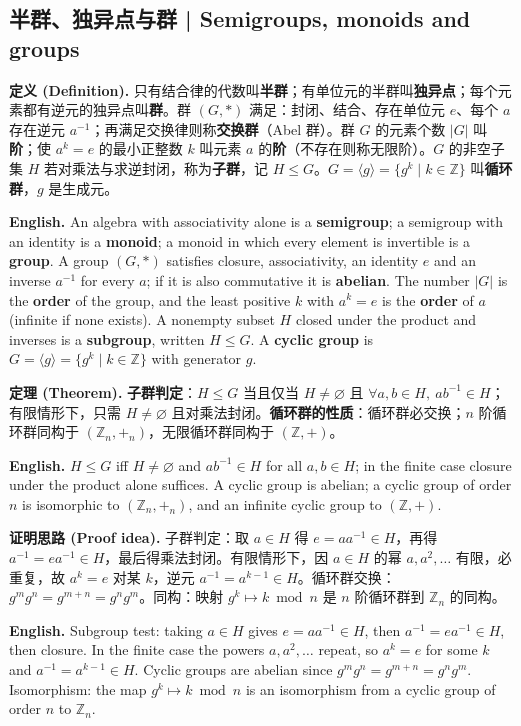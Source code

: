\documentclass[UTF8,11pt,a4paper]{ctexart}
\newcommand{\EN}[1]{\par\noindent \textbf{English.} #1\par}
\newcommand{\DEF}[2]{\par\noindent\textbf{定义 (Definition).} #1\par\EN{#2}}
\newcommand{\THM}[2]{\par\noindent\textbf{定理 (Theorem).} #1\par\EN{#2}}
\newcommand{\PRF}[2]{\par\noindent\textbf{证明思路 (Proof idea).} #1\par\EN{#2}}
\begin{document}
\subsection{半群、独异点与群 | Semigroups, monoids and groups}
\DEF{只有结合律的代数叫\textbf{半群}；有单位元的半群叫\textbf{独异点}；每个元素都有逆元的独异点叫\textbf{群}。群 $(G,*)$ 满足：封闭、结合、存在单位元 $e$、每个 $a$ 存在逆元 $a^{-1}$；再满足交换律则称\textbf{交换群}（Abel 群）。群 $G$ 的元素个数 $|G|$ 叫\textbf{阶}；使 $a^k=e$ 的最小正整数 $k$ 叫元素 $a$ 的\textbf{阶}（不存在则称无限阶）。$G$ 的非空子集 $H$ 若对乘法与求逆封闭，称为\textbf{子群}，记 $H\le G$。$G=\langle g\rangle=\{g^k\mid k\in\mathbb Z\}$ 叫\textbf{循环群}，$g$ 是生成元。}{An algebra with associativity alone is a \textbf{semigroup}; a semigroup with an identity is a \textbf{monoid}; a monoid in which every element is invertible is a \textbf{group}. A group $(G,*)$ satisfies closure, associativity, an identity $e$ and an inverse $a^{-1}$ for every $a$; if it is also commutative it is \textbf{abelian}. The number $|G|$ is the \textbf{order} of the group, and the least positive $k$ with $a^k=e$ is the \textbf{order} of $a$ (infinite if none exists). A nonempty subset $H$ closed under the product and inverses is a \textbf{subgroup}, written $H\le G$. A \textbf{cyclic group} is $G=\langle g\rangle=\{g^k\mid k\in\mathbb Z\}$ with generator $g$.}
\THM{\textbf{子群判定}：$H\le G$ 当且仅当 $H\ne\varnothing$ 且 $\forall a,b\in H,\ ab^{-1}\in H$；有限情形下，只需 $H\ne\varnothing$ 且对乘法封闭。\textbf{循环群的性质}：循环群必交换；$n$ 阶循环群同构于 $(\mathbb Z_n,+_n)$，无限循环群同构于 $(\mathbb Z,+)$。}{$H\le G$ iff $H\ne\varnothing$ and $ab^{-1}\in H$ for all $a,b\in H$; in the finite case closure under the product alone suffices. A cyclic group is abelian; a cyclic group of order $n$ is isomorphic to $(\mathbb Z_n,+_n)$, and an infinite cyclic group to $(\mathbb Z,+)$.}
\PRF{子群判定：取 $a\in H$ 得 $e=aa^{-1}\in H$，再得 $a^{-1}=ea^{-1}\in H$，最后得乘法封闭。有限情形下，因 $a\in H$ 的幂 $a,a^2,\dots$ 有限，必重复，故 $a^k=e$ 对某 $k$，逆元 $a^{-1}=a^{k-1}\in H$。循环群交换：$g^mg^n=g^{m+n}=g^ng^m$。同构：映射 $g^k\mapsto k\bmod n$ 是 $n$ 阶循环群到 $\mathbb Z_n$ 的同构。}{Subgroup test: taking $a\in H$ gives $e=aa^{-1}\in H$, then $a^{-1}=ea^{-1}\in H$, then closure. In the finite case the powers $a,a^2,\dots$ repeat, so $a^k=e$ for some $k$ and $a^{-1}=a^{k-1}\in H$. Cyclic groups are abelian since $g^mg^n=g^{m+n}=g^ng^m$. Isomorphism: the map $g^k\mapsto k\bmod n$ is an isomorphism from a cyclic group of order $n$ to $\mathbb Z_n$.}
\end{document}
